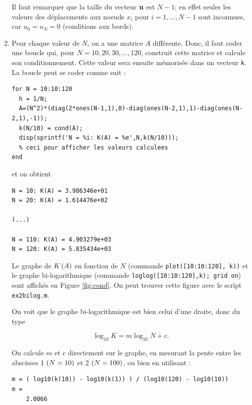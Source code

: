 \begin{enumerate}[label=\alph*)]
        Il faut remarquer que la taille du vecteur $\mathbf{u}$ est $N - 1$; en effet seules les valeurs des déplacements aux noeuds $x_{i}$ pour $i = 1, \dots, N - 1$ sont inconnues, car $u_{0} = u_{N} = 0$ (conditions aux bords).
        
  
  \item Pour chaque valeur de $N$, on a une matrice $A$ différente.
        Donc, il faut coder une boucle qui, pour $N = 10, 20, 30, \dots, 120$, construit cette matrice et calcule son conditionnement.
        Cette valeur sera ensuite mémorisée dans un vecteur \texttt{k}.
        La boucle peut se coder comme suit : 
        
\begin{verbatim}
for N = 10:10:120
  h = 1/N;
  A=(N^2)*(diag(2*ones(N-1,1),0)-diag(ones(N-2,1),1)-diag(ones(N-2,1),-1));
  k(N/10) = cond(A);
  disp(sprintf('N = %i: K(A) = %e',N,k(N/10)));
  % ceci pour afficher les valeurs calculees
end
\end{verbatim}        
        
        et on obtient
 
\begin{verbatim}
N = 10: K(A) = 3.986346e+01
N = 20: K(A) = 1.614476e+02

(...)

N = 110: K(A) = 4.903279e+03
N = 120: K(A) = 5.835434e+03
\end{verbatim} 

    Le graphe de $K \left(A\right)$ en fonction de $N$ (commande \texttt{plot([10:10:120], k))} et le graphe bi-logarithmique (commande \texttt{loglog([10:10:120],k); grid on}) sont affichés en Figure \ref{fig:cond}.
    On peut trouver cette figure avec le script \texttt{ex2bilog.m}.
    
    
    
    On voit que le graphe bi-logarithmique est bien celui d'une droite, donc du type
    
    \begin{equation*}
      \log_{10} K = m \log_{10} N + c.
    \end{equation*}
    
    On calcule $m$ et $c$ directement sur le graphe, en mesurant la pente entre les abscisses 1 $\left(N = 10\right)$ et 2 $\left(N = 100\right)$, ou bien en utilisant \MAT :
    
\begin{verbatim}
m = ( log10(k(10)) - log10(k(1)) ) / (log10(120) - log10(10))
m =
    2.0066
    

\end{verbatim}
\end{enumerate}
